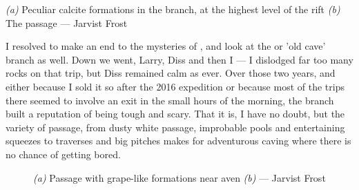 	\begin{pagefigure}
	\checkoddpage \ifoddpage \forcerectofloat \else \forceversofloat \fi
	\centering
	\begin{subfigure}[t]{0.7031\textwidth}
		\centering
		 \caption{}\label{formations povezava}
	\end{subfigure}
  	 \hfill
   	 \begin{subfigure}[t]{0.2869\textwidth}
        		\centering
        		\caption{} \label{povezava passage}
        \end{subfigure}
	\caption{
	 	  \textit{(a)} Peculiar calcite formations in the \protect{} branch, at the highest level of the rift
   		 \textit{(b)} The \protect{} passage --- Jarvist Frost}
\end{pagefigure}

	I resolved to make an end to the mysteries of , and look at the  or 'old cave' branch as well. Down we went, Larry, Diss and then I --- I dislodged far too many rocks on that trip, but Diss remained calm as ever. Over those two years, and either because I sold it so after the 2016 expedition or because most of the trips there seemed to involve an  exit in the small hours of the morning, the  branch built a reputation of being tough and scary.  That it is, I have no doubt, but the variety of passage, from dusty white  passage, improbable pools and entertaining squeezes to traverses and big pitches makes for adventurous caving where there is no chance of getting bored. 
    	
\begin{figure*}[t!]
	\checkoddpage \ifoddpage \forcerectofloat \else \forceversofloat \fi
	\centering
	\begin{subfigure}[t]{0.328\textwidth}
		\centering
		 \caption{}\label{povezava formation}
	\end{subfigure}
  	 \hfill
   	 \begin{subfigure}[t]{0.662\textwidth}
        		\centering
        		\caption{} \label{mary cafe tanguy}
        \end{subfigure}
	\caption{
	 	  \textit{(a)} Passage with grape-like formations near \protect{} aven
   		 \textit{(b)} \protect{} --- Jarvist Frost}
\end{figure*}
	
